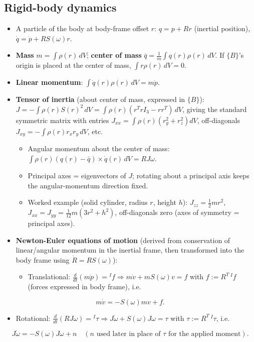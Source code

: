 \documentclass[11pt]{article}
\begin{document}
\subsection{Rigid-body dynamics}
\begin{itemize}
\item A particle of the body at body-frame offset $r$: $q = p + Rr$ (inertial position), $\dot q = \dot p + RS(\omega)r$.
\item \textbf{Mass} $m=\int \rho(r)\,dV$; \textbf{center of mass} $\bar q = \frac1m\int q(r)\rho(r)\,dV$. If $\{B\}$'s origin is placed at the center of mass, $\int r\rho(r)\,dV = 0$.
\item \textbf{Linear momentum}: $\int \dot q(r)\rho(r)\,dV = m\dot p$.
\item \textbf{Tensor of inertia} (about center of mass, expressed in $\{B\}$): $J = -\int \rho(r)S(r)^2\,dV = \int\rho(r)(r^TrI_3-rr^T)\,dV$, giving the standard symmetric matrix with entries $J_{xx}=\int\rho(r)(r_y^2+r_z^2)dV$, off-diagonals $J_{xy}=-\int\rho(r) r_xr_y\,dV$, etc.
\begin{itemize}
\item Angular momentum about the center of mass: $\int\rho(r)(q(r)-\bar q)\times\dot q(r)\,dV = RJ\omega$.
\item Principal axes = eigenvectors of $J$; rotating about a principal axis keeps the angular-momentum direction fixed.
\item Worked example (solid cylinder, radius $r$, height $h$): $J_{zz}=\tfrac12mr^2$, $J_{xx}=J_{yy}=\tfrac1{12}m(3r^2+h^2)$, off-diagonals zero (axes of symmetry = principal axes).
\end{itemize}
\item \textbf{Newton-Euler equations of motion} (derived from conservation of linear/angular momentum in the inertial frame, then transformed into the body frame using $\dot R = RS(\omega)$):
\begin{itemize}
\item Translational: $\frac{d}{dt}(m\dot p)={}^If \Rightarrow m\dot v + mS(\omega)v = f$ with $f:=R^T\,{}^If$ (forces expressed in body frame), i.e.
\end{itemize}
\end{itemize}
\[m\dot v = -S(\omega)mv+f.\]
\begin{itemize}
\item Rotational: $\frac{d}{dt}(RJ\omega)={}^I\tau \Rightarrow J\dot\omega+S(\omega)J\omega=\tau$ with $\tau:=R^T\,{}^I\tau$, i.e.
\end{itemize}
\[J\dot\omega = -S(\omega)J\omega+n \quad(n \text{ used later in place of } \tau\text{ for the applied moment}).\]
\end{document}
